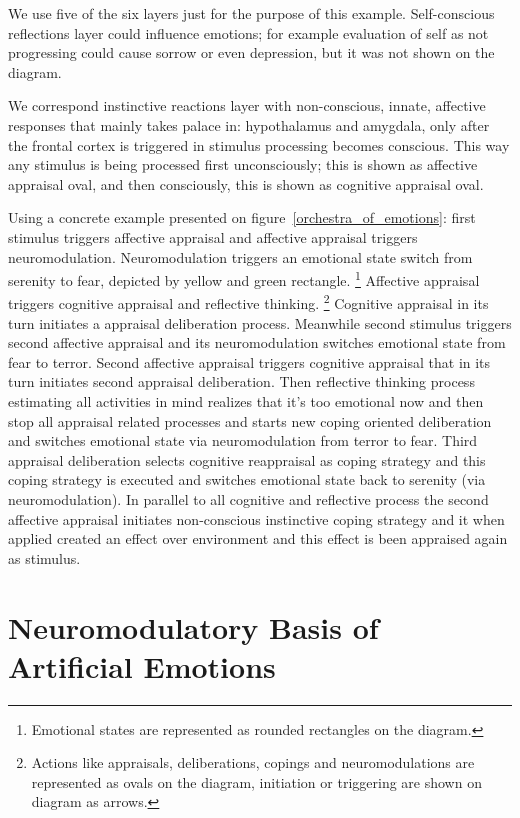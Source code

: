 We use five of the six layers just for the purpose of this example. Self-conscious reflections layer could influence emotions; for example evaluation of self as not progressing could cause sorrow or even depression, but it was not shown on the diagram.

We correspond instinctive reactions layer with non-conscious, innate, affective responses that mainly takes palace in: hypothalamus and amygdala, only after the frontal cortex is triggered in stimulus processing becomes conscious. This way any stimulus is being processed first unconsciously; this is shown as affective appraisal oval, and then consciously, this is shown as cognitive appraisal oval.

Using a concrete example presented on figure~\ref{orchestra_of_emotions}: first stimulus triggers affective appraisal and affective appraisal triggers neuromodulation. Neuromodulation triggers an emotional state switch from serenity to fear, depicted by yellow and green rectangle. \footnote{Emotional states are represented as rounded rectangles on the diagram.} Affective appraisal triggers cognitive appraisal and reflective thinking. \footnote{Actions like appraisals, deliberations, copings and neuromodulations are represented as ovals on the diagram, initiation or triggering are shown on diagram as arrows.} Cognitive appraisal in its turn initiates a appraisal deliberation process. Meanwhile second stimulus triggers second affective appraisal and its neuromodulation switches emotional state from fear to terror. Second affective appraisal triggers cognitive appraisal that in its turn initiates second appraisal deliberation. Then reflective thinking process estimating all activities in mind realizes that it's too emotional now and then stop all appraisal related processes and starts new coping oriented deliberation and switches emotional state via neuromodulation from terror to fear. Third appraisal deliberation selects cognitive reappraisal as coping strategy and this coping strategy is executed and switches emotional state back to serenity (via neuromodulation).
In parallel to all cognitive and reflective process the second affective appraisal initiates non-conscious instinctive coping strategy and it when applied created an effect over environment and this effect is been appraised again as stimulus.

\section{Neuromodulatory Basis of Artificial Emotions}

